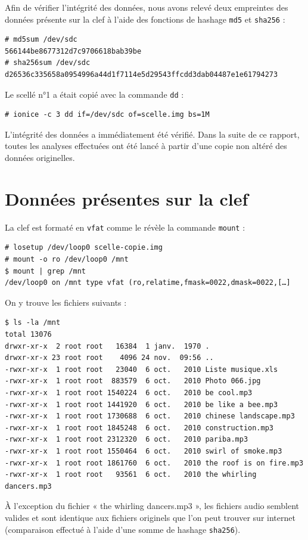 \documentclass[a4paper,11pt]{article}
\begin{document}
Afin de vérifier l’intégrité des données, nous avons relevé deux empreintes des
données présente sur la clef à l’aide des fonctions de hashage
{\tt md5} et {\tt sha256} :
\begin{verbatim}
# md5sum /dev/sdc
566144be8677312d7c9706618bab39be
# sha256sum /dev/sdc
d26536c335658a0954996a44d1f7114e5d29543ffcdd3dab04487e1e61794273
\end{verbatim}

Le scellé n°1 a était copié avec la commande {\tt dd} :
\begin{verbatim}
# ionice -c 3 dd if=/dev/sdc of=scelle.img bs=1M
\end{verbatim}

L’intégrité des données a immédiatement été vérifié.
Dans la suite de ce rapport, toutes les analyses effectuées ont été lancé à
partir d’une copie non altéré des données originelles.

\section{Données présentes sur la clef}

La clef est formaté en {\tt vfat} comme le révèle la commande {\tt mount} :
\begin{verbatim}
# losetup /dev/loop0 scelle-copie.img
# mount -o ro /dev/loop0 /mnt
$ mount | grep /mnt
/dev/loop0 on /mnt type vfat (ro,relatime,fmask=0022,dmask=0022,[…]
\end{verbatim}

On y trouve les fichiers suivants :
\begin{verbatim}
$ ls -la /mnt
total 13076
drwxr-xr-x  2 root root   16384  1 janv.  1970 .
drwxr-xr-x 23 root root    4096 24 nov.  09:56 ..
-rwxr-xr-x  1 root root   23040  6 oct.   2010 Liste musique.xls
-rwxr-xr-x  1 root root  883579  6 oct.   2010 Photo 066.jpg
-rwxr-xr-x  1 root root 1540224  6 oct.   2010 be cool.mp3
-rwxr-xr-x  1 root root 1441920  6 oct.   2010 be like a bee.mp3
-rwxr-xr-x  1 root root 1730688  6 oct.   2010 chinese landscape.mp3
-rwxr-xr-x  1 root root 1845248  6 oct.   2010 construction.mp3
-rwxr-xr-x  1 root root 2312320  6 oct.   2010 pariba.mp3
-rwxr-xr-x  1 root root 1550464  6 oct.   2010 swirl of smoke.mp3
-rwxr-xr-x  1 root root 1861760  6 oct.   2010 the roof is on fire.mp3
-rwxr-xr-x  1 root root   93561  6 oct.   2010 the whirling dancers.mp3
\end{verbatim}

À l’exception du fichier « the whirling dancers.mp3 », les fichiers audio
semblent valides et sont identique aux fichiers originels que l’on peut trouver
sur internet (comparaison effectué à l’aide d’une somme de hashage {\tt sha256}).
\end{document}
